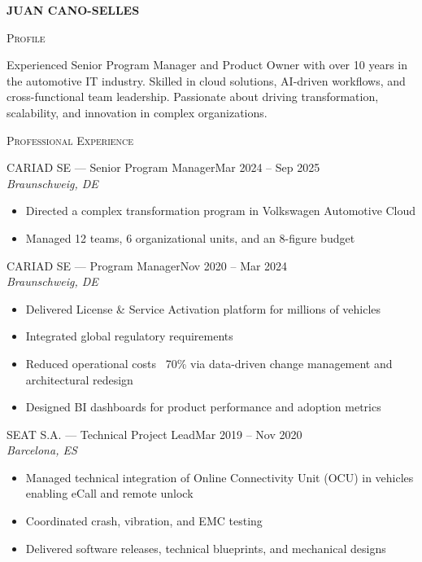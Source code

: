 \documentclass[11pt, a4paper]{article}
\newcommand{\headright}[1]{\vspace*{2ex}\textsc{\large\color{cvblue}#1}\par%
  \vspace*{-1.4ex}{\color{cvblue}\hrulefill}\par}
\newlength{\SideBarW}
\newlength{\BetweenJobsGap}
\newenvironment{job}[4]{%
  \vspace{\BetweenJobsGap}%
  \noindent\textsc{#1} --- #2\hfill {\small #4}\\%
  {\small\itshape #3}\par
  \begin{itemize}[leftmargin=1.4em,label=--,labelsep=0.5em,itemsep=0.45ex,topsep=0.2ex]
}{%
  \end{itemize}%
}
\begin{document}
\begin{minipage}[t]{\dimexpr\textwidth-\SideBarW-3mm\relax}
  \setlength{\parskip}{0.8ex}
  \setlength{\leftskip}{4mm}
  \setlength{\rightskip}{6mm}

  \vspace*{6mm}
  {\fontsize{28}{30}\sffont\bfseries\MakeUppercase{\textcolor{cvblue}{Juan Cano-Selles}}}\par
  \vspace*{1.0ex}

  \headright{Profile}
  Experienced Senior Program Manager and Product Owner with over 10 years in the automotive IT industry. Skilled in cloud solutions, AI-driven workflows, and cross-functional team leadership. Passionate about driving transformation, scalability, and innovation in complex organizations.

  \headright{Professional Experience}

  \begin{job}{CARIAD SE}{Senior Program Manager}{Braunschweig, DE}{Mar 2024 -- Sep 2025}
    \item Directed a complex transformation program in Volkswagen Automotive Cloud
    \item Managed 12 teams, 6 organizational units, and an 8-figure budget
  \end{job}

  \begin{job}{CARIAD SE}{Program Manager}{Braunschweig, DE}{Nov 2020 -- Mar 2024}
    \item Delivered License \& Service Activation platform for millions of vehicles
    \item Integrated global regulatory requirements
    \item Reduced operational costs ~70\% via data-driven change management and architectural redesign
    \item Designed BI dashboards for product performance and adoption metrics
  \end{job}

  \begin{job}{SEAT S.A.}{Technical Project Lead}{Barcelona, ES}{Mar 2019 -- Nov 2020}
    \item Managed technical integration of Online Connectivity Unit (OCU) in vehicles enabling eCall and remote unlock
    \item Coordinated crash, vibration, and EMC testing
    \item Delivered software releases, technical blueprints, and mechanical designs
  \end{job}


\end{minipage}
\end{document}
